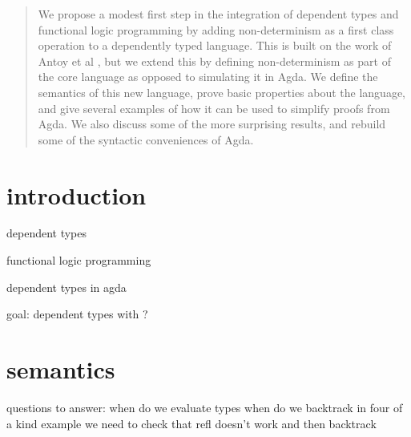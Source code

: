\documentclass{article}
\begin{document}
\begin{abstract}
  We propose a modest first step in the integration of dependent types
  and functional logic programming by adding non-determinism as a first class operation 
  to a dependently typed language.
  This is built on the work of Antoy et al \cite{agda}, but we extend this by 
  defining non-determinism as part of the core language as opposed to simulating it in Agda.
  We define the semantics of this new language, prove basic properties about the language, and give several examples of how it can be used
  to simplify proofs from Agda.
  We also discuss some of the more surprising results, and rebuild some of the syntactic conveniences of Agda.
  \sloppy
\end{abstract}

\section{introduction}

dependent types

functional logic programming

dependent types in agda

goal: dependent types with ?

\section{semantics}
questions to answer:
  when do we evaluate types
  when do we backtrack
    in four of a kind example we need to check that refl doesn't work and then backtrack

%
%
%  
%  
%  
%  
%  
\end{document}
